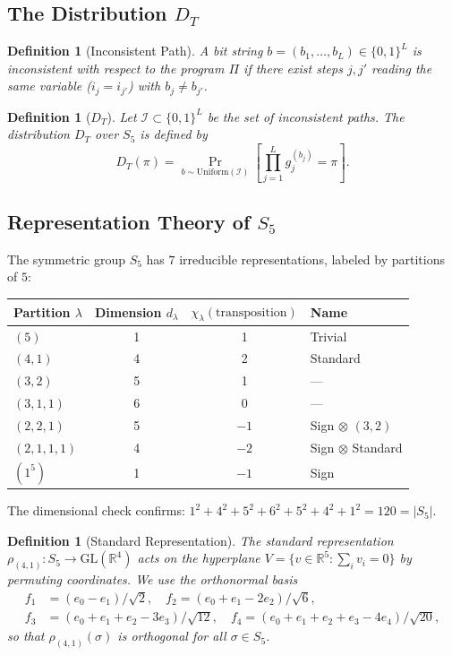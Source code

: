 \documentclass[11pt]{article}
\newtheorem{definition}[theorem]{Definition}
\begin{document}
\subsection{The Distribution $D_T$}

\begin{definition}[Inconsistent Path]
A bit string $b = (b_1, \ldots, b_L) \in \{0,1\}^L$ is \emph{inconsistent}
with respect to the program $\Pi$ if there exist steps $j, j'$ reading the
same variable ($i_j = i_{j'}$) with $b_j \neq b_{j'}$.
\end{definition}

\begin{definition}[$D_T$]
Let $\mathcal{I} \subset \{0,1\}^L$ be the set of inconsistent paths.
The distribution $D_T$ over $S_5$ is defined by
\[
D_T(\pi) = \Pr_{b \sim \mathrm{Uniform}(\mathcal{I})}
\left[ \prod_{j=1}^{L} g_j^{(b_j)} = \pi \right].
\]
\end{definition}


\subsection{Representation Theory of $S_5$}

The symmetric group $S_5$ has $7$ irreducible representations, labeled by
partitions of $5$:

\begin{center}
\begin{tabular}{lccl}
\toprule
Partition $\lambda$ & Dimension $d_\lambda$ & $\chi_\lambda(\text{transposition})$ & Name \\
\midrule
$(5)$       & 1 & 1 & Trivial \\
$(4,1)$     & 4 & 2 & Standard \\
$(3,2)$     & 5 & 1 & --- \\
$(3,1,1)$   & 6 & 0 & --- \\
$(2,2,1)$   & 5 & $-1$ & Sign $\otimes$ $(3,2)$ \\
$(2,1,1,1)$ & 4 & $-2$ & Sign $\otimes$ Standard \\
$(1^5)$     & 1 & $-1$ & Sign \\
\bottomrule
\end{tabular}
\end{center}

The dimensional check confirms: $1^2 + 4^2 + 5^2 + 6^2 + 5^2 + 4^2 + 1^2 = 120 = |S_5|$.

\begin{definition}[Standard Representation]
The standard representation $\rho_{(4,1)} : S_5 \to \mathrm{GL}(\mathbb{R}^4)$
acts on the hyperplane $V = \{v \in \mathbb{R}^5 : \sum_i v_i = 0\}$ by
permuting coordinates. We use the orthonormal basis
\begin{align*}
f_1 &= (e_0 - e_1)/\sqrt{2}, \quad
f_2 = (e_0 + e_1 - 2e_2)/\sqrt{6}, \\
f_3 &= (e_0 + e_1 + e_2 - 3e_3)/\sqrt{12}, \quad
f_4 = (e_0 + e_1 + e_2 + e_3 - 4e_4)/\sqrt{20},
\end{align*}
so that $\rho_{(4,1)}(\sigma)$ is orthogonal for all $\sigma \in S_5$.
\end{definition}
\end{document}
